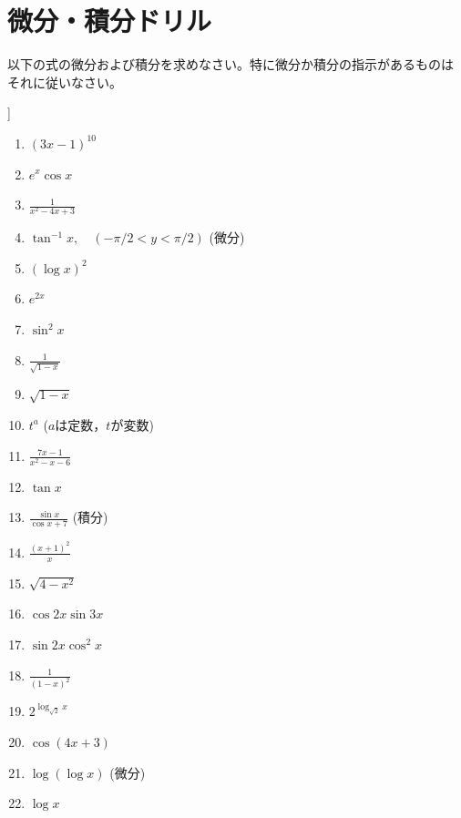 \documentclass[twocolumn,11pt]{jarticle}
\begin{document}
\section{微分・積分ドリル\label{app:biseki}}
\begin{center}
以下の式の微分および積分を求めなさい。特に微分か積分の指示があるものは
それに従いなさい。
\end{center}]
{\small
\begin{enumerate}
\item \label{itemapp:(3x-1)10}$\displaystyle (3x-1)^{10}$
\item \label{itemapp:e2cosx}$\displaystyle e^x\cos x $
\item $\displaystyle \frac{1}{x^2-4x+3}$
\item \label{ditemapp:tan-1x}$\displaystyle \tan^{-1}x,\quad(-\pi/2<y<\pi/2)$ (微分)
\item \label{itemapp:(logx)2}$\displaystyle (\log x)^2 $
\item $e^{2x}$
\item \label{itemapp:sin2x}$\displaystyle \sin^2 x $
\item \label{itemapp:1/sqrt(1-x)}$\displaystyle \frac{1}{\sqrt{1-x}}$
\item \label{itemapp:sqrt(1-x)}$\displaystyle \sqrt{1-x} $
\item \label{ditemapp:t^a}$t^a$  ($a$は定数，$t$が変数)
\item \label{itemapp:(7x-1)(x^2-x-6)}$\displaystyle \frac{7x-1}{x^2-x-6}$
\item \label{itemapp:tanx}$\displaystyle \tan x$
\item \label{itemapp:sinx/cosx+7}$\displaystyle \frac{\sin x}{\cos x+7}$ (積分)
\item \label{itemapp:(1+x)2/x}$\displaystyle\frac{(x+1)^2}{x}$
\item \label{itemapp:(4-x2)}$\displaystyle \sqrt{4-x^2}$
\item \label{itemapp:cos2xsin3x}$\displaystyle\cos 2x\sin 3x$
\item $\sin 2x\cos^2 x$
\item \label{itemapp:1/(1-x)2}$\displaystyle \frac{1}{(1-x)^2}$
\item $2^{\log_{\sqrt{2}}x}$
\item \label{itemapp:cos(4x+3)}$\displaystyle \cos(4x+3)$
\item \label{ditemapp:loglogx}$\log(\log x)$ (微分)
\item $\log x$

\end{enumerate}}
\end{document}

